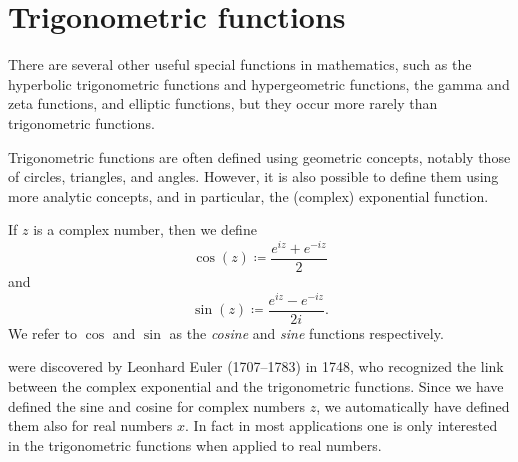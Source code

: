 \section{Trigonometric functions}\label{ii:sec:4.7}

\begin{note}
  There are several other useful special functions in mathematics, such as the hyperbolic trigonometric functions and hypergeometric functions, the gamma and zeta functions, and elliptic functions, but they occur more rarely than trigonometric functions.
\end{note}

\begin{note}
  Trigonometric functions are often defined using geometric concepts, notably those of circles, triangles, and angles.
  However, it is also possible to define them using more analytic concepts, and in particular, the (complex) exponential function.
\end{note}

\begin{defn}\label{ii:4.7.1}
  If \(z\) is a complex number, then we define
  \[
    \cos(z) \coloneqq \dfrac{e^{iz} + e^{-iz}}{2}
  \]
  and
  \[
    \sin(z) \coloneqq \dfrac{e^{iz} - e^{-iz}}{2i}.
  \]
  We refer to \(\cos\) and \(\sin\) as the \emph{cosine} and \emph{sine} functions respectively.
\end{defn}

\begin{note}
   were discovered by Leonhard Euler (1707--1783) in 1748, who recognized the link between the complex exponential and the trigonometric functions.
  Since we have defined the sine and cosine for complex numbers \(z\), we automatically have defined them also for real numbers \(x\).
  In fact in most applications one is only interested in the trigonometric functions when applied to real numbers.
\end{note}

